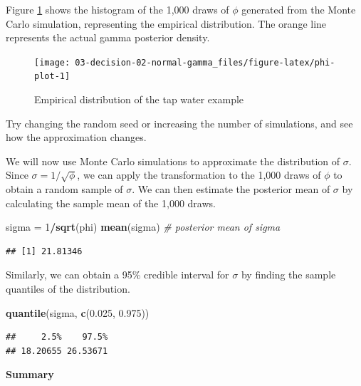 \documentclass[]{book}
\newenvironment{Shaded}{\begin{snugshade}}{\end{snugshade}}
\newcommand{\KeywordTok}[1]{\textcolor[rgb]{0.13,0.29,0.53}{\textbf{#1}}}
\newcommand{\DecValTok}[1]{\textcolor[rgb]{0.00,0.00,0.81}{#1}}
\newcommand{\FloatTok}[1]{\textcolor[rgb]{0.00,0.00,0.81}{#1}}
\newcommand{\StringTok}[1]{\textcolor[rgb]{0.31,0.60,0.02}{#1}}
\newcommand{\CommentTok}[1]{\textcolor[rgb]{0.56,0.35,0.01}{\textit{#1}}}
\newcommand{\OperatorTok}[1]{\textcolor[rgb]{0.81,0.36,0.00}{\textbf{#1}}}
\newcommand{\NormalTok}[1]{#1}
\theoremstyle{definition}
\theoremstyle{definition}
\theoremstyle{definition}
\theoremstyle{remark}
\begin{document}
Figure \ref{fig:phi-plot} shows the histogram of the 1,000 draws of
\(\phi\) generated from the Monte Carlo simulation, representing the
empirical distribution. The orange line represents the actual gamma
posterior density.

\begin{figure}

{\centering \texttt{[image: 03-decision-02-normal-gamma\_files/figure-latex/phi-plot-1]} 

}

\caption{Empirical distribution of the tap water example}\label{fig:phi-plot}
\end{figure}

Try changing the random seed or increasing the number of simulations,
and see how the approximation changes.

We will now use Monte Carlo simulations to approximate the distribution
of \(\sigma\). Since \(\sigma = 1/\sqrt{\phi}\), we can apply the
transformation to the 1,000 draws of \(\phi\) to obtain a random sample
of \(\sigma\). We can then estimate the posterior mean of \(\sigma\) by
calculating the sample mean of the 1,000 draws.

\begin{Shaded}
\begin{Highlighting}[]
\NormalTok{sigma =}\StringTok{ }\DecValTok{1}\OperatorTok{/}\KeywordTok{sqrt}\NormalTok{(phi)}
\KeywordTok{mean}\NormalTok{(sigma) }\CommentTok{# posterior mean of sigma}
\end{Highlighting}
\end{Shaded}

\begin{verbatim}
## [1] 21.81346
\end{verbatim}

Similarly, we can obtain a 95\% credible interval for \(\sigma\) by
finding the sample quantiles of the distribution.

\begin{Shaded}
\begin{Highlighting}[]
\KeywordTok{quantile}\NormalTok{(sigma, }\KeywordTok{c}\NormalTok{(}\FloatTok{0.025}\NormalTok{, }\FloatTok{0.975}\NormalTok{))}
\end{Highlighting}
\end{Shaded}

\begin{verbatim}
##     2.5%    97.5% 
## 18.20655 26.53671
\end{verbatim}

\textbf{Summary}
\end{document}
